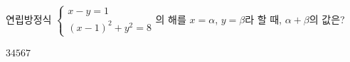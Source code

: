 연립방정식 $\begin{cases} x-y=1 \\ (x-1)^2+y^2=8 \end{cases}$의 해를 $x=\alpha$, $y=\beta$라 할 때, $\alpha+\beta$의 값은? 
\begin{choices32}{$3$}{$4$}{$5$}{$6$}{$7$}\end{choices32}
